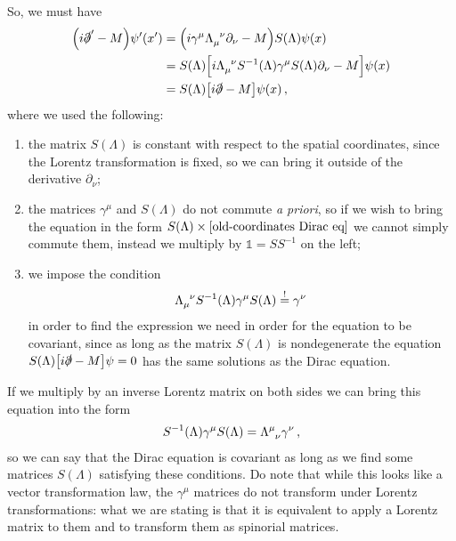 \documentclass[main.tex]{subfiles}
\begin{document}
So, we must have 
%
\begin{subequations}
\begin{align}
\qty(i \slashed{\partial}' - M) \psi^{\prime } (x') &=
\qty(i \gamma^{\mu } \tensor{\Lambda }{_{\mu }^{\nu }} \partial_{\nu } -M) S(\Lambda ) \psi (x)  
\\
&= S(\Lambda ) \qty[i \tensor{\Lambda }{_{\mu }^{\nu }} S^{-1}(\Lambda ) 
\gamma^{\mu } S(\Lambda ) \partial_{\nu } - M ] \psi (x)  \\
&=S(\Lambda ) \qty[i \slashed{\partial} - M] \psi (x)
\,,
\end{align}
\end{subequations}
%
where we used the following:
\begin{enumerate}
  \item the matrix \(S(\Lambda )\) is constant with respect to the spatial coordinates, since the Lorentz transformation is fixed, so we can bring it outside of the derivative \(\partial_{\nu }\);
  \item the matrices \(\gamma^{\mu }  \) and \(S(\Lambda )\) do not commute \emph{a priori}, so if we wish to bring the equation in the form \(S(\Lambda ) \times \qty[\text{old-coordinates Dirac eq}]\) we cannot simply commute them, instead we multiply by \(\mathbb{1} = S S^{-1}\) on the left;
  \item we impose the condition 
  \begin{align}
  \tensor{\Lambda }{_{\mu }^{\nu }} S^{-1}(\Lambda ) \gamma^{\mu } S(\Lambda ) \overset{!}{=} \gamma^{\nu }
  \,
  \end{align}
  in order to find the expression we need in order for the equation to be covariant, since as long as the matrix \(S(\Lambda )\) is nondegenerate the equation \(S(\Lambda ) \qty[i \slashed{\partial} - M] \psi =0\) has the same solutions as the Dirac equation.
\end{enumerate}

If we multiply by an inverse Lorentz matrix on both sides we can bring this equation into the form 
% 
\begin{align} \label{eq:spinorial-representation-definition}
S^{-1}(\Lambda ) \gamma^{\mu } S(\Lambda ) = \tensor{\Lambda }{^{\mu }_{\nu }} \gamma^{\nu }
\,,
\end{align}
%
so we can say that the Dirac equation is covariant as long as we find some matrices \(S(\Lambda )\) satisfying these conditions. 
Do note that while this looks like a vector transformation law, the \(\gamma^{\mu }\) matrices do not transform under Lorentz transformations: what we are stating is that it is equivalent to apply a Lorentz matrix to them and to transform them as spinorial matrices. 
\end{document}
